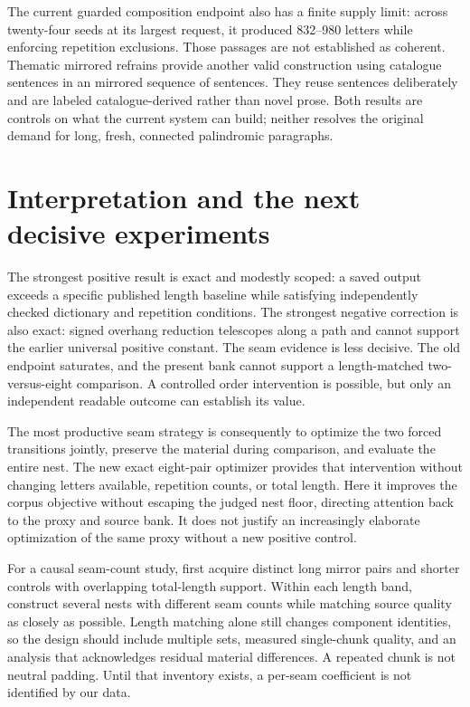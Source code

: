 \documentclass[11pt,letterpaper]{article}
\newcommand{\pageend}{\clearpage}
\begin{document}
The current guarded composition endpoint also has a finite supply limit: across twenty-four seeds at its largest request, it produced 832--980 letters while enforcing repetition exclusions. Those passages are not established as coherent. Thematic mirrored refrains provide another valid construction using catalogue sentences in an mirrored sequence of sentences. They reuse sentences deliberately and are labeled catalogue-derived rather than novel prose. Both results are controls on what the current system can build; neither resolves the original demand for long, fresh, connected palindromic paragraphs.
\pageend

\section{Interpretation and the next decisive experiments}
\label{sec:discussion}
The strongest positive result is exact and modestly scoped: a saved output exceeds a specific published length baseline while satisfying independently checked dictionary and repetition conditions. The strongest negative correction is also exact: signed overhang reduction telescopes along a path and cannot support the earlier universal positive constant. The seam evidence is less decisive. The old endpoint saturates, and the present bank cannot support a length-matched two-versus-eight comparison. A controlled order intervention is possible, but only an independent readable outcome can establish its value.

The most productive seam strategy is consequently to optimize the two forced transitions jointly, preserve the material during comparison, and evaluate the entire nest. The new exact eight-pair optimizer provides that intervention without changing letters available, repetition counts, or total length. Here it improves the corpus objective without escaping the judged nest floor, directing attention back to the proxy and source bank. It does not justify an increasingly elaborate optimization of the same proxy without a new positive control.

For a causal seam-count study, first acquire distinct long mirror pairs and shorter controls with overlapping total-length support. Within each length band, construct several nests with different seam counts while matching source quality as closely as possible. Length matching alone still changes component identities, so the design should include multiple sets, measured single-chunk quality, and an analysis that acknowledges residual material differences. A repeated chunk is not neutral padding. Until that inventory exists, a per-seam coefficient is not identified by our data.
\end{document}
